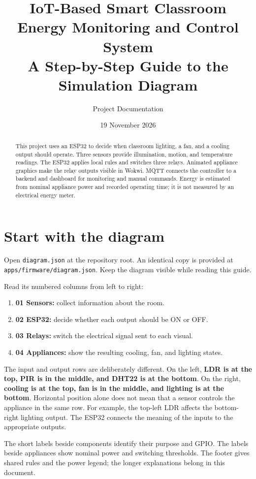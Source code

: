 \documentclass[11pt,a4paper]{article}
\title{IoT-Based Smart Classroom\\
Energy Monitoring and Control System\\[5pt]
\large A Step-by-Step Guide to the Simulation Diagram}
\author{Project Documentation}
\date{19 November 2026}
\newcommand{\file}[1]{\nolinkurl{#1}}
\begin{document}
\maketitle

\begin{abstract}
This project uses an ESP32 to decide when classroom lighting, a fan, and a
cooling output should operate. Three sensors provide illumination,
motion, and temperature readings. The ESP32 applies local rules and
switches three relays. Animated appliance graphics make the relay outputs
visible in Wokwi. MQTT connects the controller to a backend and dashboard
for monitoring and manual commands. Energy is estimated from nominal
appliance power and recorded operating time; it is not measured by an
electrical energy meter.
\end{abstract}

\section{Start with the diagram}
\label{sec:orientation}
Open \file{diagram.json} at the repository root. An identical copy is
provided at \file{apps/firmware/diagram.json}. Keep the diagram visible
while reading this guide.

Read its numbered columns from left to right:
\begin{enumerate}
  \item \textbf{01 Sensors:} collect information about the room.
  \item \textbf{02 ESP32:} decide whether each output should be ON or OFF.
  \item \textbf{03 Relays:} switch the electrical signal sent to each visual.
  \item \textbf{04 Appliances:} show the resulting cooling, fan, and lighting states.
\end{enumerate}

The input and output rows are deliberately different. On the left,
\textbf{LDR is at the top, PIR is in the middle, and DHT22 is at the
bottom}. On the right, \textbf{cooling is at the top, fan is in the
middle, and lighting is at the bottom}. Horizontal position alone does
not mean that a sensor controls the appliance in the same row. For
example, the top-left LDR affects the bottom-right lighting output.
The ESP32 connects the meaning of the inputs to the appropriate outputs.

The short labels beside components identify their purpose and GPIO.
The labels beside appliances show nominal power and switching thresholds.
The footer gives shared rules and the power legend; the longer
explanations belong in this document.
\end{document}
